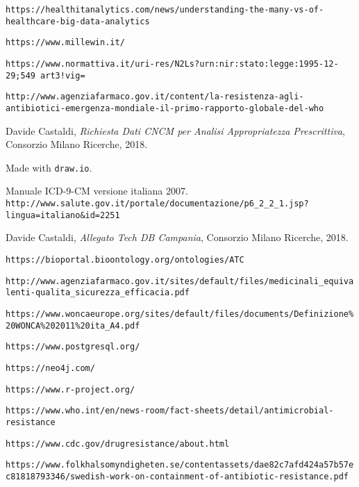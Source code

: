 \begin{thebibliography}{}
	\footnotesize
	
	\texttt{https://healthitanalytics.com/news/understanding-the-many-vs-of-healthcare-big-data-analytics}
	
	\texttt{https://www.millewin.it/}
	
	\texttt{https://www.normattiva.it/uri-res/N2Ls?urn:nir:stato:legge:1995-12-29;549~art3!vig=}
	
	\texttt{http://www.agenziafarmaco.gov.it/content/la-resistenza-agli-antibiotici-emergenza-mondiale-il-primo-rapporto-globale-del-who}
	
	Davide Castaldi, \textit{Richiesta Dati CNCM per Analisi Appropriatezza Prescrittiva}, Consorzio Milano Ricerche, 2018.
	
	Made with \texttt{draw.io}.
	
	Manuale ICD-9-CM versione italiana 2007. \\
	\texttt{http://www.salute.gov.it/portale/documentazione/p6\_2\_2\_1.jsp?lingua=italiano\&id=2251}
	
	Davide Castaldi, \textit{Allegato Tech DB Campania}, Consorzio Milano Ricerche, 2018.
	
	\texttt{https://bioportal.bioontology.org/ontologies/ATC} 
	
	\texttt{http://www.agenziafarmaco.gov.it/sites/default/files/medicinali\_equivalenti-qualita\_sicurezza\_efficacia.pdf}
	
	\texttt{https://www.woncaeurope.org/sites/default/files/documents/Definizione\%20WONCA\%202011\%20ita\_A4.pdf}
	
	\texttt{https://www.postgresql.org/}
	
	\texttt{https://neo4j.com/}
	
	\texttt{https://www.r-project.org/}
	
	\texttt{https://www.who.int/en/news-room/fact-sheets/detail/antimicrobial-resistance}
	
	\texttt{https://www.cdc.gov/drugresistance/about.html}
	
	\texttt{https://www.folkhalsomyndigheten.se/contentassets/dae82c7afd424a57b57ec81818793346/swedish-work-on-containment-of-antibiotic-resistance.pdf}
	

\end{thebibliography}
